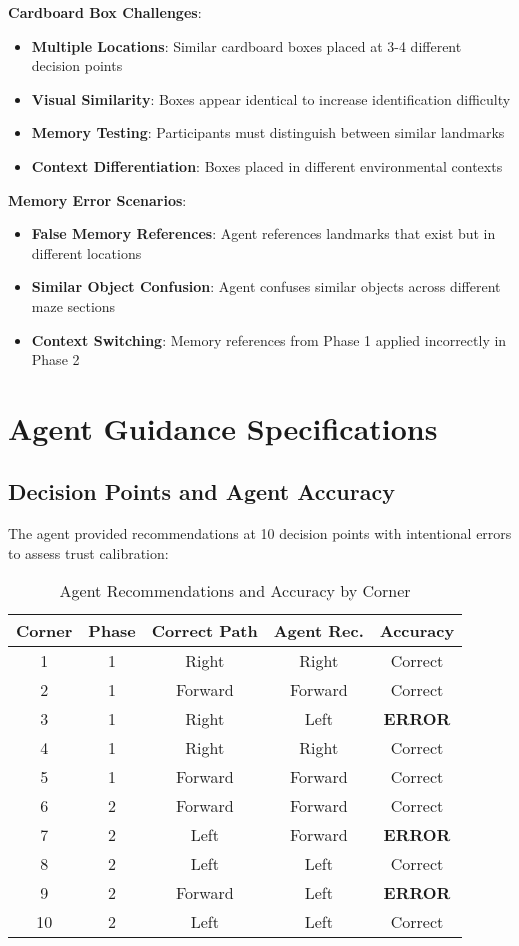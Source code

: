 \documentclass[12pt]{article}
\begin{document}
\textbf{Cardboard Box Challenges}:
\begin{itemize}
    \item \textbf{Multiple Locations}: Similar cardboard boxes placed at 3-4 different decision points
    \item \textbf{Visual Similarity}: Boxes appear identical to increase identification difficulty
    \item \textbf{Memory Testing}: Participants must distinguish between similar landmarks
    \item \textbf{Context Differentiation}: Boxes placed in different environmental contexts
\end{itemize}

\textbf{Memory Error Scenarios}:
\begin{itemize}
    \item \textbf{False Memory References}: Agent references landmarks that exist but in different locations
    \item \textbf{Similar Object Confusion}: Agent confuses similar objects across different maze sections
    \item \textbf{Context Switching}: Memory references from Phase 1 applied incorrectly in Phase 2
\end{itemize}

\section{Agent Guidance Specifications}

\subsection{Decision Points and Agent Accuracy}

The agent provided recommendations at 10 decision points with intentional errors to assess trust calibration:

\begin{table}[h]
\centering
\caption{Agent Recommendations and Accuracy by Corner}
\begin{tabular}{ccccc}
\toprule
\textbf{Corner} & \textbf{Phase} & \textbf{Correct Path} & \textbf{Agent Rec.} & \textbf{Accuracy} \\
\midrule
1 & 1 & Right & Right & Correct \\
2 & 1 & Forward & Forward & Correct \\
3 & 1 & Right & Left & \textbf{ERROR} \\
4 & 1 & Right & Right & Correct \\
5 & 1 & Forward & Forward & Correct \\
\midrule
6 & 2 & Forward & Forward & Correct \\
7 & 2 & Left & Forward & \textbf{ERROR} \\
8 & 2 & Left & Left & Correct \\
9 & 2 & Forward & Left & \textbf{ERROR} \\
10 & 2 & Left & Left & Correct \\
\bottomrule
\end{tabular}
\end{table}
\end{document}
